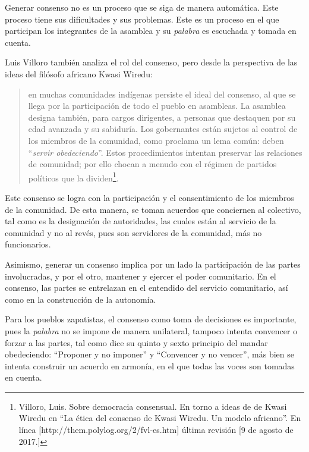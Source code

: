 \documentclass[oneside]{book}
\begin{document}
Generar consenso no es un proceso que se siga de manera automática. Este proceso tiene sus dificultades y sus problemas. Este es un proceso en el que participan los integrantes de la asamblea y su \textit{palabra} es escuchada y tomada en cuenta.

Luis Villoro también analiza el rol del consenso, pero desde la perspectiva de las ideas del filósofo africano Kwasi Wiredu:
\begin{quote}
en muchas comunidades indígenas persiste el ideal del consenso, al que se llega por la participación de todo el pueblo en asambleas. La asamblea designa también, para cargos dirigentes, a personas que destaquen por su edad avanzada y su sabiduría. Los gobernantes están sujetos al control de los miembros de la comunidad, como proclama un lema común: deben “\textit{servir obedeciendo}”. Estos procedimientos intentan preservar las relaciones de comunidad; por ello chocan a menudo con el régimen de partidos políticos que la dividen\footnote{Villoro, Luis. Sobre democracia consensual. En torno a ideas de de Kwasi Wiredu en ``La ética del consenso de Kwasi Wiredu. Un modelo africano''. En línea [http://them.polylog.org/2/fvl-es.htm] última revisión [9 de agosto de 2017.]}.
\end{quote}

Este consenso se logra con la participación y el consentimiento de los miembros de la comunidad. De esta manera, se toman acuerdos que conciernen al colectivo, tal como es la designación de autoridades, las cuales están al servicio de la comunidad y no al revés, pues son servidores de la comunidad, más no funcionarios.

Asimismo, generar un consenso implica por un lado la participación de las partes involucradas, y por el otro, mantener y ejercer el poder comunitario. En el consenso, las partes se entrelazan en el entendido del servicio comunitario, así como en la construcción de la autonomía.

Para los pueblos zapatistas, el consenso como toma de decisiones es importante, pues la \textit{palabra} no se impone de manera unilateral, tampoco intenta convencer o forzar a las partes, tal como dice su quinto y sexto principio del mandar obedeciendo: “Proponer y no imponer” y “Convencer y no vencer”, más bien se intenta construir un acuerdo en armonía, en el que todas las voces son tomadas en cuenta.
\end{document}
